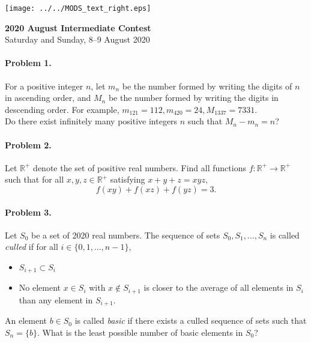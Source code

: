 \documentclass[12pt]{article}
\newcommand*{\currpos}[1]{%
  \zsavepos{#1}%
}
\begin{document}
		\begin{flushleft}
		\texttt{[image: ../../MODS\_text\_right.eps]}\\
		\end{flushleft}
		\vspace{15pt}
		\noindent \LARGE\textbf{2020 August Intermediate Contest}\\[10pt]
		\noindent \normalsize{Saturday and Sunday, 8--9 August 2020}\\
		\noindent \makebox[\linewidth]{\rule{\textwidth}{0.4pt}}
			
	\normalsize
	
	\paragraph{\currpos{one}Problem 1.} For a positive integer $n$, let $m_n$ be the number formed by writing the digits of $n$ in ascending order, and $M_n$ be the number formed by writing the digits in descending order. For example, $m_{121} = 112, m_{420} = 24, M_{1337} = 7331$.\\[7pt]	
	\noindent Do there exist infinitely many positive integers $n$ such that $M_n - m_n = n$?
	
	\paragraph{\currpos{two}Problem 2.} Let \(\mathbb{R}^+\) denote the set of positive real numbers. Find all functions $f: \mathbb{R}^+ \to \mathbb{R}^+$ such that for all $x, y, z \in \mathbb{R}^+$ satisfying $x + y + z = xyz,$ $$f(xy) + f(xz) + f(yz) = 3.$$
	
	\paragraph{\currpos{three}Problem 3.} Let \(S_0\) be a set of 2020 real numbers. The sequence of sets \(S_0, S_1, \dots, S_n\) is called \emph{culled} if for all \(i \in \{0, 1, \ldots, n-1\}\),
	\begin{itemize}
		\item \(S_{i+1} \subset S_i\)
		\item No element \(x \in S_i\) with \(x \notin S_{i+1}\) is closer to the average of all elements in \(S_i\) than any element in \(S_{i+1}\).
	\end{itemize}
	An element \(b \in S_0\) is called \emph{basic} if there exists a culled sequence of sets such that \(S_n = \{b\}\). What is the least possible number of basic elements in \(S_0\)?
	
\end{document}
